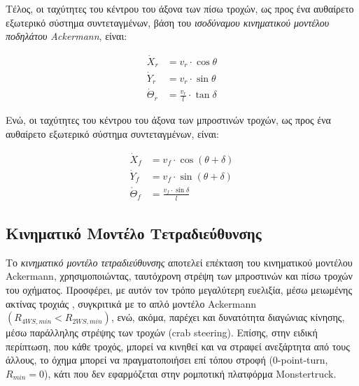 {\bigskip
Τέλος, οι ταχύτητες του κέντρου του άξονα των πίσω τροχών, ως προς ένα αυθαίρετο εξωτερικό σύστημα συντεταγμένων, βάση του \textit{ισοδύναμου κινηματικού μοντέλου ποδηλάτου Ackermann}, είναι:

\begin{align}
	\dot X_r &= v_r \cdot \cos\theta\\
	\dot Y_r &= v_r \cdot \sin\theta\\
	\dot \Theta_r &= \frac{v_r}{l} \cdot \tan\delta
\end{align}

Ενώ, οι ταχύτητες του κέντρου του άξονα των μπροστινών τροχών, ως προς ένα αυθαίρετο εξωτερικό σύστημα συντεταγμένων, είναι:

\begin{align}
	\dot X_f &= v_f \cdot \cos(\theta+\delta)\\
	\dot Y_f &= v_f \cdot \sin(\theta+\delta)\\
	\dot \Theta_f &= \frac{v_f \cdot \sin\delta}{l}
\end{align}


\bigskip
\subsection{Κινηματικό Μοντέλο Τετραδιεύθυνσης} \label{ssec:4ws_kinematics}
Το \textit{κινηματικό μοντέλο τετραδιεύθυνσης} αποτελεί επέκταση του {κινηματικού μοντέλου Ackermann}, χρησιμοποιώντας, ταυτόχρονη στρέψη των μπροστινών και πίσω τροχών του οχήματος. Προσφέρει, με αυτόν τον τρόπο μεγαλύτερη ευελιξία, μέσω μειωμένης ακτίνας τροχιάς , συγκριτικά με το απλό {μοντέλο Ackermann} $(R_{4WS, min} < R_{2WS, min})$, ενώ, ακόμα, παρέχει και δυνατότητα  διαγώνιας κίνησης, μέσω παράλληλης στρέψης των τροχών (crab steering). Επίσης, στην ειδική περίπτωση, που κάθε τροχός, μπορεί να κινηθεί και να στραφεί ανεξάρτητα από τους άλλους, το όχημα μπορεί να πραγματοποιήσει επί τόπου στροφή (0-point-turn, $R_{min}=0$), κάτι που δεν εφαρμόζεται στην ρομποτική πλατφόρμα {Monstertruck}.

}
